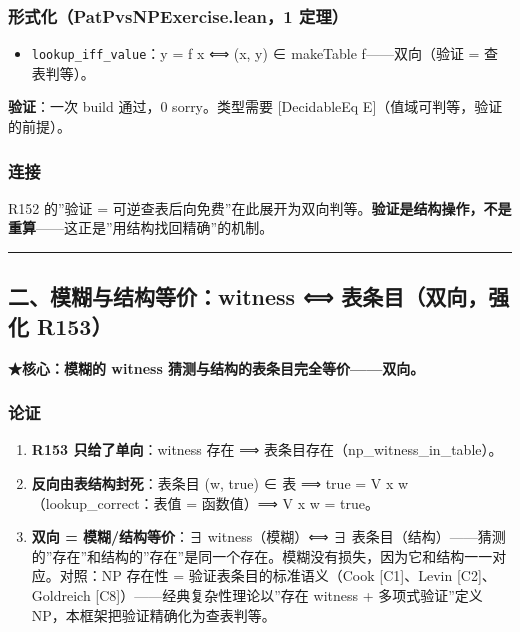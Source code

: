 \documentclass[
]{article}
\providecommand{\tightlist}{%
  \setlength{\itemsep}{0pt}\setlength{\parskip}{0pt}}
\begin{document}
\subsubsection{形式化（PatPvsNPExercise.lean，1
定理）}\label{ux5f62ux5f0fux5316patpvsnpexercise.lean1-ux5b9aux7406}

\begin{itemize}
\tightlist
\item
  \texttt{lookup\_iff\_value}：y = f x ⟺ (x, y) ∈ makeTable
  f------双向（验证 = 查表判等）。
\end{itemize}

\textbf{验证}：一次 build 通过，0 sorry。类型需要 {[}DecidableEq
E{]}（值域可判等，验证的前提）。

\subsubsection{连接}\label{ux8fdeux63a5}

R152 的''验证 =
可逆查表后向免费''在此展开为双向判等。\textbf{验证是结构操作，不是重算}------这正是''用结构找回精确''的机制。

\begin{center}\rule{0.5\linewidth}{0.5pt}\end{center}

\subsection{二、模糊与结构等价：witness ⟺ 表条目（双向，强化
R153）}\label{ux4e8cux6a21ux7ccaux4e0eux7ed3ux6784ux7b49ux4ef7witness-ux8868ux6761ux76eeux53ccux5411ux5f3aux5316-r153}

\textbf{★核心：模糊的 witness 猜测与结构的表条目完全等价------双向。}

\subsubsection{论证}\label{ux8bbaux8bc1-1}

\begin{enumerate}
\def\labelenumi{\arabic{enumi}.}
\tightlist
\item
  \textbf{R153 只给了单向}：witness 存在 ⟹
  表条目存在（np\_witness\_in\_table）。
\item
  \textbf{反向由表结构封死}：表条目 (w, true) ∈ 表 ⟹ true = V x
  w（lookup\_correct：表值 = 函数值）⟹ V x w = true。
\item
  \textbf{双向 = 模糊/结构等价}：∃ witness（模糊）⟺ ∃
  表条目（结构）------猜测的''存在''和结构的''存在''是同一个存在。模糊没有损失，因为它和结构一一对应。对照：NP
  存在性 = 验证表条目的标准语义（Cook {[}C1{]}、Levin
  {[}C2{]}、Goldreich {[}C8{]}）------经典复杂性理论以''存在 witness +
  多项式验证''定义 NP，本框架把验证精确化为查表判等。
\end{enumerate}
\end{document}
